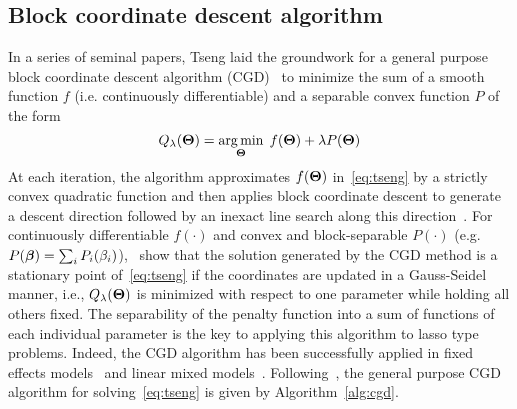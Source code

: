 \subsection{Block coordinate descent algorithm} \label{subsec:cgd}

In a series of seminal papers, Tseng laid the groundwork for a general purpose block coordinate descent algorithm (CGD)~\citep{tseng2009coordinate,tseng1988coordinate,tseng2001convergence} to minimize the sum of a smooth function $f$ (i.e. continuously differentiable) and a separable convex function $P$ of the form
\begin{equation}
Q_{\lambda}(\boldsymbol{\Theta}) = \operatorname*{arg\,min}_{\boldsymbol{\Theta}}\; f(\boldsymbol{\Theta}) + \lambda P(\boldsymbol{\Theta}) \label{eq:tseng}
\end{equation}
At each iteration, the algorithm approximates $f(\boldsymbol{\Theta})$ in~\eqref{eq:tseng} by a strictly convex quadratic function and then applies block coordinate descent to generate a descent direction followed by an inexact line search along this direction~\citep{tseng2009coordinate}. 
For continuously differentiable $f(\cdot)$ and convex and block-separable $P(\cdot)$ \mbox{(e.g. $P(\boldsymbol{\beta}) = \sum_i P_i (\beta_i)$)},~\cite{tseng2009coordinate} show that the solution generated by the CGD method is a stationary point of~\eqref{eq:tseng} if the coordinates are updated in a Gauss-Seidel manner, i.e., $Q_{\lambda}(\boldsymbol{\Theta})$ is minimized with respect to one parameter while holding all others fixed. 
The separability of the penalty function into a sum of functions of each individual parameter is the key to applying this algorithm to lasso type problems. 
Indeed, the CGD algorithm has been successfully applied in fixed effects models~\citep{meier2008group,friedman2010regularization} and linear mixed models~\citep{schelldorfer2011estimation}. Following~\cite{tseng2009coordinate}, the general purpose CGD algorithm for solving~\eqref{eq:tseng} is given by Algorithm~\ref{alg:cgd}. 


